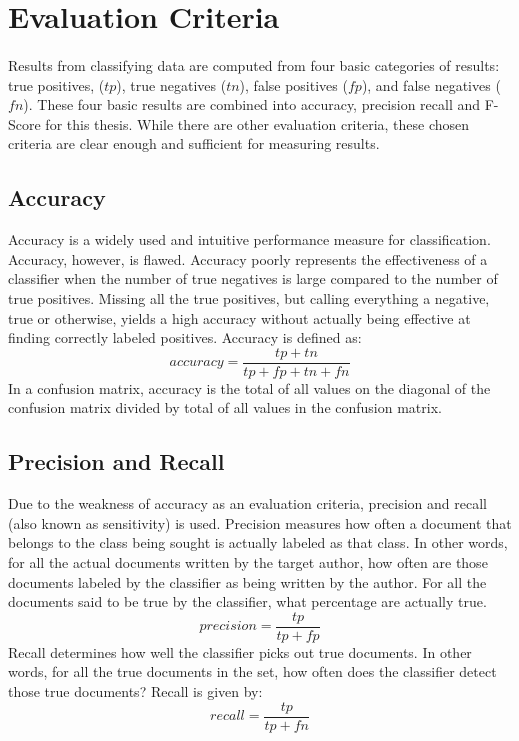 \section {Evaluation Criteria}
	\paragraph{}Results from classifying data are computed from four basic categories of results: true positives, ($tp$), true negatives ($tn$), false positives ($fp$), and false negatives ($fn$).  These four basic results are combined into accuracy, precision recall and F-Score for this thesis.  While there are other evaluation criteria, these chosen criteria are clear enough and sufficient for measuring results.
	
	\subsection {Accuracy} Accuracy is a widely used and intuitive performance measure for classification.  Accuracy, however, is flawed.  Accuracy poorly represents the effectiveness of a classifier when the number of true negatives is large compared to the number of true positives.  Missing all the true positives, but calling everything a negative, true or otherwise, yields a high accuracy without actually being effective at finding correctly labeled positives.  Accuracy is defined as:
	\begin{equation} accuracy = \frac{tp + tn}{tp + fp + tn + fn} \end{equation}\cite{sokolova_beyond_2006}
	In a confusion matrix, accuracy is the total of all values on the diagonal of the confusion matrix divided by total of all values in the confusion matrix.

	\subsection {Precision and Recall} Due to the weakness of accuracy as an evaluation criteria, precision and recall (also known as sensitivity) is used.  Precision measures how often a document that belongs to the class being sought is actually labeled as that class.  In other words, for all the actual documents written by the target author, how often are those documents labeled by the classifier as being written by the author.  For all the documents said to be true by the classifier, what percentage are actually true.
	\begin{equation} precision = \frac{tp}{tp + fp} \end{equation} Recall determines how well the classifier picks out true documents.  In other words, for all the true documents in the set, how often does the classifier detect those true documents?  Recall is given by:
	\begin{equation} recall = \frac{tp}{tp + fn} \end{equation}\cite{sokolova_beyond_2006}

